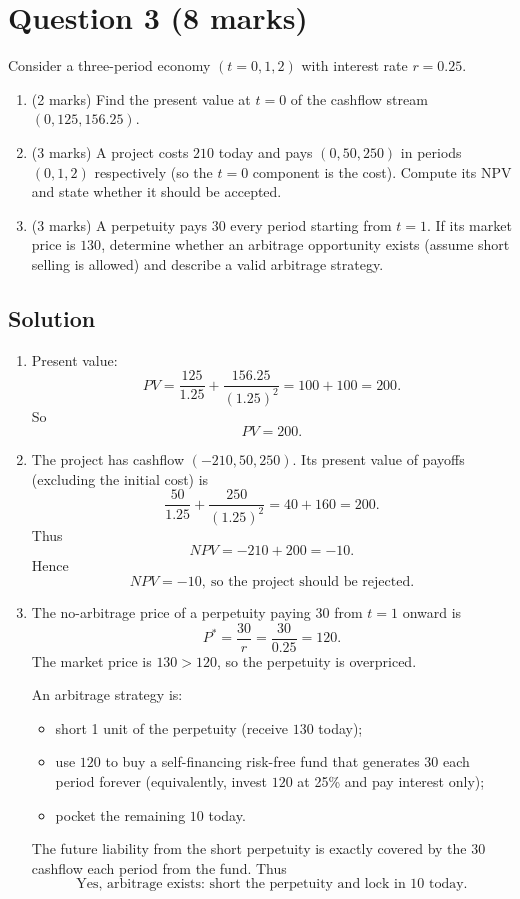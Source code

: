 \documentclass[12pt]{article}
\begin{document}
\bigskip

\section*{Question 3 (8 marks)}

Consider a three-period economy $(t=0,1,2)$ with interest rate $r=0.25$.

\begin{enumerate}[label=(\alph*)]
\item (2 marks) Find the present value at $t=0$ of the cashflow stream $(0,125,156.25)$.
\item (3 marks) A project costs $210$ today and pays $(0,50,250)$ in periods $(0,1,2)$ respectively (so the $t=0$ component is the cost). Compute its NPV and state whether it should be accepted.
\item (3 marks) A perpetuity pays $30$ every period starting from $t=1$. If its market price is $130$, determine whether an arbitrage opportunity exists (assume short selling is allowed) and describe a valid arbitrage strategy.
\end{enumerate}

\subsection*{Solution}

\begin{enumerate}[label=(\alph*)]
\item Present value:
\[
PV = \frac{125}{1.25}+\frac{156.25}{(1.25)^2}=100+100=200.
\]
So
\[
\boxed{PV=200.}
\]

\item The project has cashflow $(-210,50,250)$. Its present value of payoffs (excluding the initial cost) is
\[
\frac{50}{1.25}+\frac{250}{(1.25)^2}=40+160=200.
\]
Thus
\[
NPV = -210+200 = -10.
\]
Hence
\[
\boxed{NPV=-10,\ \text{so the project should be rejected.}}
\]

\item The no-arbitrage price of a perpetuity paying $30$ from $t=1$ onward is
\[
P^* = \frac{30}{r}=\frac{30}{0.25}=120.
\]
The market price is $130>120$, so the perpetuity is overpriced.

An arbitrage strategy is:
\begin{itemize}[leftmargin=*]
\item short 1 unit of the perpetuity (receive $130$ today);
\item use $120$ to buy a self-financing risk-free fund that generates $30$ each period forever (equivalently, invest $120$ at 25\% and pay interest only);
\item pocket the remaining $10$ today.
\end{itemize}
The future liability from the short perpetuity is exactly covered by the $30$ cashflow each period from the fund.
Thus
\[
\boxed{\text{Yes, arbitrage exists: short the perpetuity and lock in }10\text{ today.}}
\]
\end{enumerate}
\end{document}
